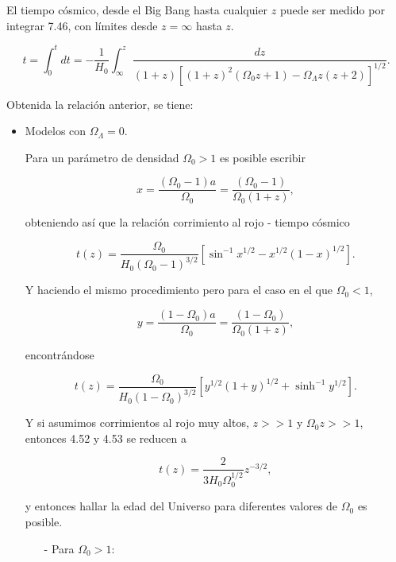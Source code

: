 \documentclass[11pt]{article}
\begin{document}
{    El tiempo cósmico, desde el Big Bang hasta cualquier $z$ puede ser medido por integrar 7.46, con límites desde $z = \infty$ hasta $z$. 

    \begin{equation}
	    t = \int_0^t{dt} = - \frac{1}{H_0} \int_{\infty}^z{\frac{dz}{  (1+z)[(1+z)^2 (\Omega_0 z + 1) - \Omega_{\Lambda} z (z+2) ]^{1/2}}.} 
	\end{equation}


    Obtenida la relación anterior, se tiene:

        \begin{itemize}
	        \item Modelos con $\Omega_{\Lambda}=0$. 

		Para un parámetro de densidad $\Omega_0 >1$ es posible escribir 

		$$ 
		x = \frac{(\Omega_0-1)a}{\Omega_0} = \frac{(\Omega_0-1)}{\Omega_0 (1+z)} , 		
		$$
		
		obteniendo así que la relación corrimiento al rojo -  tiempo cósmico 

		\begin{equation}
			t(z) = \frac{\Omega_0}{H_0( \Omega_0 - 1)^{3/2}}[\sin^{-1} x^{1/2} - x^{1/2} (1-x)^{1/2}].
		\end{equation}
		
		Y haciendo el mismo procedimiento pero para el caso en el que $\Omega_0 < 1$,

	    $$
	    y = \frac{(1- \Omega_0)a}{\Omega_0} = \frac{(1-\Omega_0)}{\Omega_0 (1+z)},
	    $$

    encontrándose

    \begin{equation}
	    t(z) = \frac{\Omega_0}{H_0(1 - \Omega_0)^{3/2}}[ y^{1/2} (1+y)^{1/2} + \sinh^{-1} y^{1/2}].
    \end{equation}
    
    Y si asumimos corrimientos al rojo muy altos, $z>>1$ y $\Omega_0 z >>1$, entonces 4.52 y 4.53 se reducen a 

    \begin{equation}
        t(z) = \frac{2}{3H_0 \Omega_0^{1/2}} z^{-3/2},
    \end{equation}
		
		
		y entonces hallar la edad del Universo para diferentes valores de $\Omega_0$ es posible. 

        \begin{itemize}

            \item[-] Para $\Omega_0>1$:


\end{itemize}
\end{itemize}}
\end{document}
